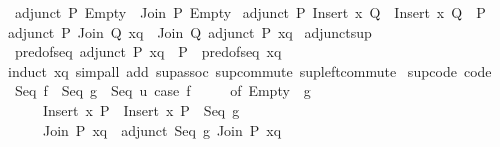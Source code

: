 \begin{isabellebody}
\ \ {\isachardoublequoteopen}adjunct\ P\ Empty\ {\isacharequal}{\kern0pt}\ Join\ P\ Empty{\isachardoublequoteclose}\isanewline
{\isacharbar}{\kern0pt}\ {\isachardoublequoteopen}adjunct\ P\ {\isacharparenleft}{\kern0pt}Insert\ x\ Q{\isacharparenright}{\kern0pt}\ {\isacharequal}{\kern0pt}\ Insert\ x\ {\isacharparenleft}{\kern0pt}Q\ {\isasymsqunion}\ P{\isacharparenright}{\kern0pt}{\isachardoublequoteclose}\isanewline
{\isacharbar}{\kern0pt}\ {\isachardoublequoteopen}adjunct\ P\ {\isacharparenleft}{\kern0pt}Join\ Q\ xq{\isacharparenright}{\kern0pt}\ {\isacharequal}{\kern0pt}\ Join\ Q\ {\isacharparenleft}{\kern0pt}adjunct\ P\ xq{\isacharparenright}{\kern0pt}{\isachardoublequoteclose}\isanewline
\isanewline
{}\isamarkupfalse%
\ adjunct{\isacharunderscore}{\kern0pt}sup{\isacharcolon}{\kern0pt}\isanewline
\ \ {\isachardoublequoteopen}pred{\isacharunderscore}{\kern0pt}of{\isacharunderscore}{\kern0pt}seq\ {\isacharparenleft}{\kern0pt}adjunct\ P\ xq{\isacharparenright}{\kern0pt}\ {\isacharequal}{\kern0pt}\ P\ {\isasymsqunion}\ pred{\isacharunderscore}{\kern0pt}of{\isacharunderscore}{\kern0pt}seq\ xq{\isachardoublequoteclose}\isanewline
%
\isadelimproof
\ \ %
\endisadelimproof
%
\isatagproof
{}\isamarkupfalse%
\ {\isacharparenleft}{\kern0pt}induct\ xq{\isacharparenright}{\kern0pt}\ {\isacharparenleft}{\kern0pt}simp{\isacharunderscore}{\kern0pt}all\ add{\isacharcolon}{\kern0pt}\ sup{\isacharunderscore}{\kern0pt}assoc\ sup{\isacharunderscore}{\kern0pt}commute\ sup{\isacharunderscore}{\kern0pt}left{\isacharunderscore}{\kern0pt}commute{\isacharparenright}{\kern0pt}%
\endisatagproof
{\isafoldproof}%
%
\isadelimproof
\isanewline
%
\endisadelimproof
\isanewline
{}\isamarkupfalse%
\ sup{\isacharunderscore}{\kern0pt}code\ {\isacharbrackleft}{\kern0pt}code{\isacharbrackright}{\kern0pt}{\isacharcolon}{\kern0pt}\isanewline
\ \ {\isachardoublequoteopen}Seq\ f\ {\isasymsqunion}\ Seq\ g\ {\isacharequal}{\kern0pt}\ Seq\ {\isacharparenleft}{\kern0pt}{\isasymlambda}u{\isachardot}{\kern0pt}\ case\ f\ {\isacharparenleft}{\kern0pt}{\isacharparenright}{\kern0pt}\isanewline
\ \ \ \ of\ Empty\ {\isasymRightarrow}\ g\ {\isacharparenleft}{\kern0pt}{\isacharparenright}{\kern0pt}\isanewline
\ \ \ \ \ {\isacharbar}{\kern0pt}\ Insert\ x\ P\ {\isasymRightarrow}\ Insert\ x\ {\isacharparenleft}{\kern0pt}P\ {\isasymsqunion}\ Seq\ g{\isacharparenright}{\kern0pt}\isanewline
\ \ \ \ \ {\isacharbar}{\kern0pt}\ Join\ P\ xq\ {\isasymRightarrow}\ adjunct\ {\isacharparenleft}{\kern0pt}Seq\ g{\isacharparenright}{\kern0pt}\ {\isacharparenleft}{\kern0pt}Join\ P\ xq{\isacharparenright}{\kern0pt}{\isacharparenright}{\kern0pt}{\isachardoublequoteclose}\isanewline

\end{isabellebody}
